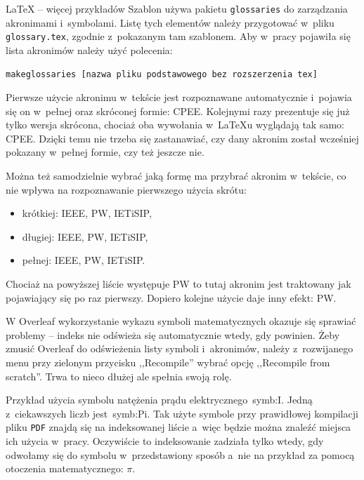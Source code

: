 \begin{easyappendix}{\LaTeX{} -- więcej przykładów}
Szablon używa pakietu \texttt{glossaries} do zarządzania akronimami i~symbolami. Listę tych elementów należy przygotować w~pliku \texttt{glossary.tex}, zgodnie z~pokazanym tam szablonem. Aby w~pracy pojawiła się lista akronimów należy użyć polecenia:

\begin{lstlisting}[language=bash,
	numbers=none,
	caption=Wygenerowanie listy skrótów i~symboli,
	label={lst:gloss}]
	makeglossaries [nazwa pliku podstawowego bez rozszerzenia tex]
\end{lstlisting}

Pierwsze użycie akronimu w~tekście jest rozpoznawane automatycznie i~pojawia się on w~pełnej oraz skróconej formie: \gls{CPEE}. Kolejnymi razy prezentuje się już tylko wersja skrócona, chociaż oba wywołania w~\LaTeX{u} wyglądają tak samo: \gls{CPEE}. Dzięki temu nie trzeba się zastanawiać, czy dany akronim został wcześniej pokazany w~pełnej formie, czy też jeszcze nie.

Można też samodzielnie wybrać jaką formę ma przybrać akronim w~tekście, co nie wpływa na rozpoznawanie pierwszego użycia skrótu:
\begin{itemize}
	\item krótkiej: \acrshort{IEEE}, \acrshort{PW}, \acrshort{IETiSIP},
	\item długiej: \acrlong{IEEE}, \acrlong{PW}, \acrlong{IETiSIP},
	\item pełnej: \acrfull{IEEE}, \acrfull{PW}, \acrfull{IETiSIP}.
\end{itemize}

Chociaż na powyższej liście występuje \gls{PW} to tutaj akronim jest traktowany jak pojawiający się po raz pierwszy. Dopiero kolejne użycie daje inny efekt: \gls{PW}.

W Overleaf wykorzystanie wykazu symboli matematycznych okazuje się sprawiać problemy -- indeks nie odświeża się automatycznie wtedy, gdy powinien. Żeby zmusić Overleaf do odświeżenia listy symboli i~akronimów, należy z~rozwijanego menu przy zielonym przycisku ,,Recompile'' wybrać opcję ,,Recompile from scratch''. Trwa to nieco dłużej ale spełnia swoją rolę.

Przykład użycia symbolu natężenia prądu elektrycznego~\gls{symb:I}. Jedną z~ciekawszych liczb jest~\gls{symb:Pi}. Tak użyte symbole przy prawidłowej kompilacji pliku \texttt{PDF} znajdą się na indeksowanej liście a~więc będzie można znaleźć miejsca ich użycia w~pracy. Oczywiście to indeksowanie zadziała tylko wtedy, gdy odwołamy się do symbolu w~przedstawiony sposób a~nie na przykład za pomocą otoczenia matematycznego: $\pi$.


\end{easyappendix}

